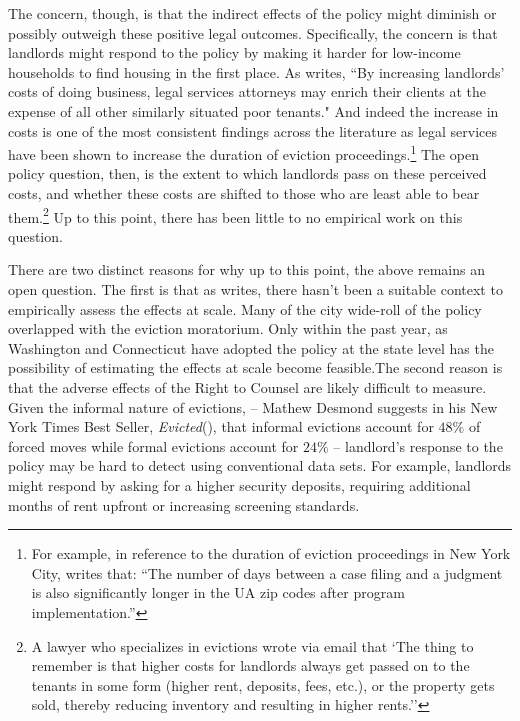 \documentclass[a4paper,12pt]{article}
\begin{document}
The concern, though, is that the indirect effects of the policy might diminish or possibly outweigh these positive legal outcomes. Specifically, the concern is that landlords might respond to the policy by making it harder for low-income households to find housing in the first place. As \cite{gunn1995eviction} writes, ``By increasing landlords' costs of doing business, legal services attorneys may enrich their clients at the expense of all other similarly situated poor tenants." And indeed the increase in costs is one of the most consistent findings across the literature as legal services have been shown to increase the duration of eviction proceedings.\footnote{For example, in reference to the duration of eviction proceedings in New York City,  \cite{cassidy2022effects} writes that: ``The number of days between a case filing and a judgment is also significantly longer in the UA zip codes after program implementation.''} The open policy question, then, is the extent to which landlords pass on these perceived costs, and whether these costs are shifted to those who are least able to bear them.\footnote{A lawyer who specializes in evictions wrote via email that `The thing to remember is that higher costs for landlords always get passed on to the tenants in some form (higher rent, deposits, fees, etc.), or the property gets sold, thereby reducing inventory and resulting in higher rents.''} Up to this point, there has been little to no empirical work on this question. \par 
There are two distinct reasons for why up to this point, the above remains an open question. The first is that as \cite{abramson2021welfare} writes, there hasn't been a suitable context to empirically assess the effects at scale. Many of the city wide-roll of the policy overlapped with the eviction moratorium. Only within the past year, as Washington and Connecticut have adopted the policy at the state level has the possibility of estimating the effects at scale become feasible.The second reason is that the adverse effects of the Right to Counsel are likely difficult to measure. Given the informal nature of evictions, -- Mathew Desmond suggests in his New York Times Best Seller, \textit{Evicted}(\cite{desmond2016evicted}), that informal evictions account for $48\%$ of forced moves while formal evictions account for $24\%$ -- landlord's response to the policy may be hard to detect using conventional data sets. For example, landlords might respond by asking for a higher security deposits, requiring additional months of rent upfront or increasing screening standards. \par 
\end{document}
